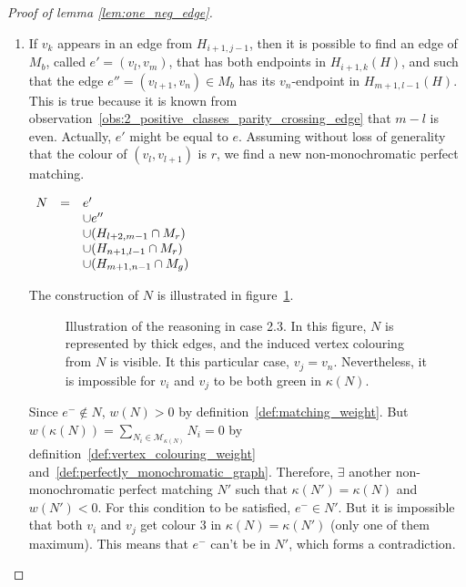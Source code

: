 \begin{proof}[Proof of lemma \ref{lem:one_neg_edge}]
\begin{enumerate}
\begin{enumerate}
            \item If $v_k$ appears in an edge from $H_{i+1, j-1}$, then it is possible to find an edge of $M_b$, called $e' = (v_l, v_m)$, that has both endpoints in $H_{i+1, k}(H)$, and such that the edge $e'' = (v_{l+1}, v_n) \in M_b$ has its $v_n$-endpoint in $H_{m+1, l-1}(H)$.
            This is true because it is known from observation~\ref{obs:2_positive_classes_parity_crossing_edge} that $m-l$ is even.
            Actually, $e'$ might be equal to $e$.
            Assuming without loss of generality that the colour of $(v_l, v_{l+1})$ is $r$, we find a new non-monochromatic perfect matching.

                \begin{center}
                    $\begin{array}{r c l}
                        N & = & e'                              \\
                          &   & \cup e''                        \\
                          &   & \cup (H_{l+2, m-1} \cap M_r)    \\
                          &   & \cup (H_{n+1, l-1} \cap M_r)    \\
                          &   & \cup (H_{m+1, n-1} \cap M_g)
                    \end{array}$
                \end{center}

                The construction of $N$ is illustrated in figure~\ref{fig:unique_neg_2_3}.

                \begin{figure}[H]
                    \caption{Illustration of the reasoning in case 2.3. In this figure, $N$ is represented by thick edges, and the induced vertex colouring from $N$ is visible. It this particular case, $v_j = v_n$. Nevertheless, it is impossible for $v_i$ and $v_j$ to be both green in $\kappa(N)$.}
                    \label{fig:unique_neg_2_3}
                \end{figure}

                Since $e^- \notin N$, $w(N) > 0$ by definition~\ref{def:matching_weight}.
                But $w(\kappa(N)) = \sum\limits_{N_i \in \mathcal{M}_{\kappa(N)}} N_i = 0$ by definition~\ref{def:vertex_colouring_weight} and~\ref{def:perfectly_monochromatic_graph}.
                Therefore, $\exists$ another non-monochromatic perfect matching $N'$ such that $\kappa(N') = \kappa(N)$ and $w(N') < 0$.
                For this condition to be satisfied, $e^- \in N'$.
                But it is impossible that both $v_i$ and $v_j$ get colour $3$ in $\kappa(N) = \kappa(N')$ (only one of them maximum).
                This means that $e^-$ can't be in $N'$, which forms a contradiction.
        \end{enumerate}
    \end{enumerate}

\end{proof}

